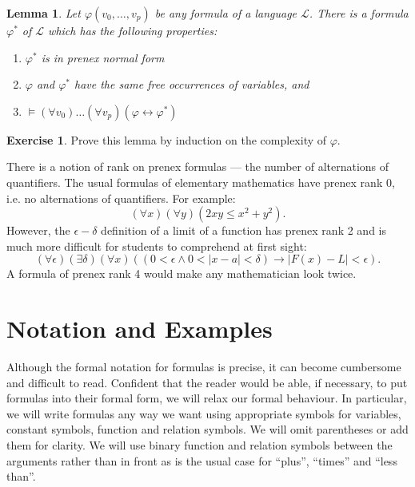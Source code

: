 \documentclass[titlepage, oneside]{amsbook}
\theoremstyle{plain}
\newtheorem{lemma}{Lemma}
\theoremstyle{definition}
\newtheorem{exercise}{Exercise}
\theoremstyle{remark}
\begin{document}
\begin{lemma}\label{L:prenex} Let $\varphi (v_{0} , \dots , v_{p}) $
be any formula
of a language $\mathcal{L} $. There is a 
formula $\varphi^*  $ of $\mathcal{L} $  which has the following
properties:

\begin{enumerate}
\item $\varphi^* $ is in prenex normal form
\item $\varphi $ and $\varphi^* $ have the same free occurrences of 
variables, and 
\item $\models (\forall v_{0}) \dots (\forall v_{p})(\varphi
\leftrightarrow \varphi^* )$

\end{enumerate}

\end{lemma}

\begin{exercise} Prove this lemma by induction on the complexity of
$\varphi$.
\end{exercise}

There is a notion of rank on prenex formulas --- the number of
alternations  of quantifiers. The usual formulas of elementary
mathematics have
prenex rank $0$, i.e. no alternations of quantifiers.  For example: \[
(\forall x) ( \forall y) ( 2 xy \leq x^2 + y^2) . \]
However, the $\epsilon - \delta$ definition of a limit of a function
has prenex rank 2 and is much more difficult for students to comprehend
at first sight: \[ (\forall \epsilon ) (\exists \delta ) (\forall x ) ( ( 0 <
\epsilon \wedge 0 < | x-a| < \delta) \to | F (x) - L | < \epsilon). \] 
A formula of prenex rank 4 would make any mathematician look twice.














\chapter{Notation and Examples}

 Although the formal notation for
formulas is precise, it can become cumbersome and difficult to read.
Confident that the
reader would be able, if necessary,  to put formulas into their formal
form, we will
relax our formal behaviour.  In particular,
 we will write formulas any way we want using appropriate symbols
for variables, constant symbols, function and relation symbols.  We
will omit 
parentheses or add them for clarity.  We will use
binary
function and relation symbols  between the arguments rather than in
front as is the usual case
for ``plus'', ``times'' and ``less than''.
\end{document}
